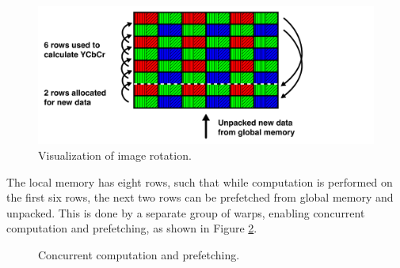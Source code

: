 \begin{figure}[H]
    \centering
    \includegraphics[width=\textwidth]{figures/polarized_image/rolling.pdf}
    \caption{Visualization of image rotation.}
    \label{fig:reuse}
\end{figure}

The local memory has eight rows, such that while computation is performed on the first six rows, the next two rows can be prefetched from global memory and unpacked.
This is done by a separate group of warps, enabling concurrent computation and prefetching, as shown in Figure \ref{fig:saperation}.


\begin{figure}[H]
    \centering
    \caption{Concurrent computation and prefetching.}
    \label{fig:saperation}
\end{figure}



